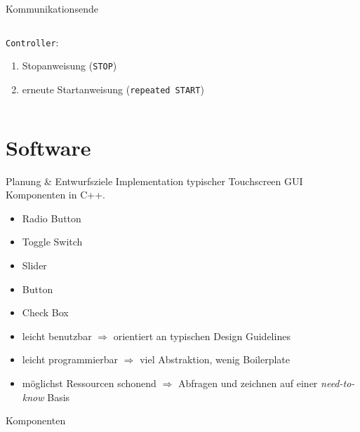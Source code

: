 \documentclass[12pt]{beamer}
\begin{document}
	\begin{frame}{Kommunikationsende}
		\begin{columns}
			\begin{column}{0.55\textwidth}
				\texttt{Controller}:
				\begin{enumerate}[a]
					\item Stopanweisung (\texttt{STOP})
					\item erneute Startanweisung (\texttt{repeated START})
				\end{enumerate}
			\end{column}
			\begin{column}{0.4\textwidth}
				
				
			\end{column}
		\end{columns}
	\end{frame}
	
	\section{Software}
	\frame{\tableofcontents[currentsection]}
	
	\begin{frame}{Planung \& Entwurfsziele}
		Implementation typischer Touchscreen GUI Komponenten in C++.
		
		\begin{itemize}
			\item Radio Button
			\item Toggle Switch
			\item Slider
			\item Button
			\item Check Box
		\end{itemize}
		\pause
		\bigskip
		\begin{itemize}
			\item leicht benutzbar $\Rightarrow$ orientiert an typischen Design Guidelines \cite{material-components} \pause
			\item leicht programmierbar $\Rightarrow$ viel Abstraktion, wenig Boilerplate \pause
			\item möglichst Ressourcen schonend $\Rightarrow$ Abfragen und zeichnen auf einer \emph{need-to-know} Basis
		\end{itemize}
	\end{frame}

	\begin{frame}{Komponenten}
		\centering
	\end{frame}
\end{document}
